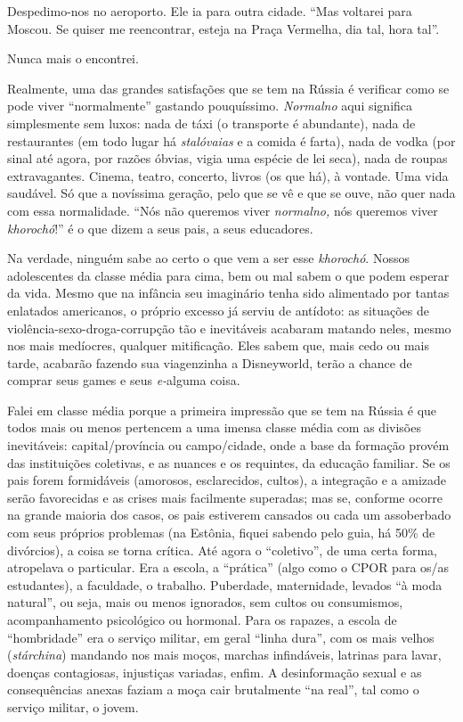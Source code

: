 Despedimo-nos no aeroporto. Ele ia para outra cidade. ``Mas voltarei
para Moscou. Se quiser me reencontrar, esteja na Praça Vermelha, dia
tal, hora tal''.

Nunca mais o encontrei.

Realmente, uma das grandes satisfações que se tem na Rússia é verificar
como se pode viver ``normalmente'' gastando pouquíssimo. \emph{Normalno}
aqui significa simplesmente sem luxos: nada de táxi (o transporte é
abundante), nada de restaurantes (em todo lugar há \emph{stalóvaias} e a
comida é farta), nada de vodka (por sinal até agora, por razões óbvias,
vigia uma espécie de lei seca), nada de roupas extravagantes. Cinema,
teatro, concerto, livros (os que há), à vontade. Uma vida saudável. Só
que a novíssima geração, pelo que se vê e que se ouve, não quer nada com
essa normalidade. ``Nós não queremos viver \emph{normalno,} nós queremos
viver \emph{khorochó}!'' é o que dizem a seus pais, a seus educadores.

Na verdade, ninguém sabe ao certo o que vem a ser esse \emph{khorochó}.
Nossos adolescentes da classe média para cima, bem ou mal sabem o que
podem esperar da vida. Mesmo que na infância seu imaginário tenha sido
alimentado por tantas enlatados americanos, o próprio excesso já serviu
de antídoto: as situações de violência-sexo-droga-corrupção tão e
inevitáveis acabaram matando neles, mesmo nos mais medíocres, qualquer
mitificação. Eles sabem que, mais cedo ou mais tarde, acabarão fazendo
sua viagenzinha a Disneyworld, terão a chance de comprar seus games e
seus \emph{e-}alguma coisa.

Falei em classe média porque a primeira impressão que se tem na Rússia é
que todos mais ou menos pertencem a uma imensa classe média com as
divisões inevitáveis: capital/província ou campo/cidade, onde a base da
formação provém das instituições coletivas, e as nuances e os requintes,
da educação familiar. Se os pais forem formidáveis (amorosos,
esclarecidos, cultos), a integração e a amizade serão favorecidas e as
crises mais facilmente superadas; mas se, conforme ocorre na grande
maioria dos casos, os pais estiverem cansados ou cada um assoberbado com
seus próprios problemas (na Estônia, fiquei sabendo pelo guia, há 50\%
de divórcios), a coisa se torna crítica. Até agora o ``coletivo'', de
uma certa forma, atropelava o particular. Era a escola, a ``prática''
(algo como o CPOR para os/as estudantes), a faculdade, o trabalho.
Puberdade, maternidade, levados ``à moda natural'', ou seja, mais ou
menos ignorados, sem cultos ou consumismos, acompanhamento psicológico
ou hormonal. Para os rapazes, a escola de ``hombridade'' era o serviço
militar, em geral ``linha dura'', com os mais velhos (\emph{stárchina})
mandando nos mais moços, marchas infindáveis, latrinas para lavar,
doenças contagiosas, injustiças variadas, enfim. A desinformação sexual
e as consequências anexas faziam a moça cair brutalmente ``na real'',
tal como o serviço militar, o jovem.

